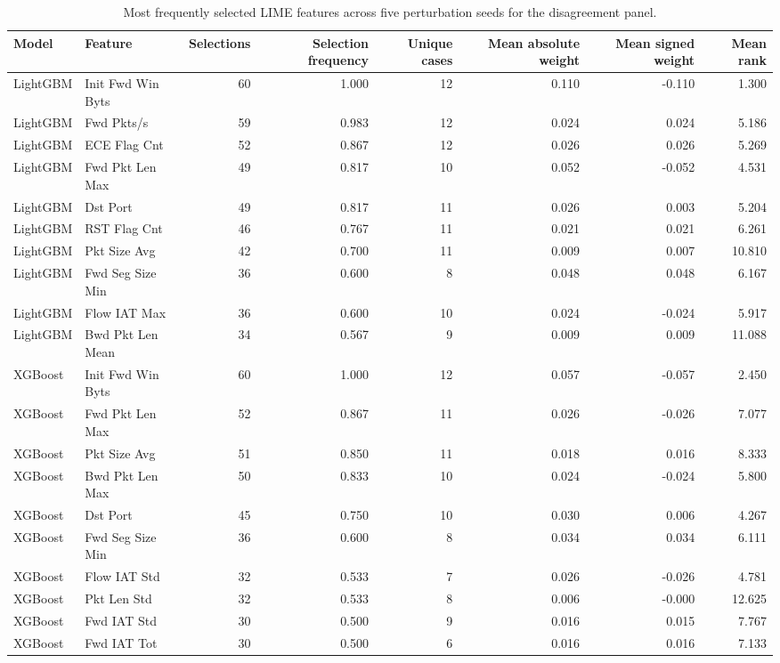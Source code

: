 \begin{table}
\caption{Most frequently selected LIME features across five perturbation seeds for the disagreement panel.}
\label{tab:lime_recurring_features}
\begin{tabular}{llrrrrrr}
\toprule
Model & Feature & Selections & Selection frequency & Unique cases & Mean absolute weight & Mean signed weight & Mean rank \\
\midrule
LightGBM & Init Fwd Win Byts & 60 & 1.000 & 12 & 0.110 & -0.110 & 1.300 \\
LightGBM & Fwd Pkts/s & 59 & 0.983 & 12 & 0.024 & 0.024 & 5.186 \\
LightGBM & ECE Flag Cnt & 52 & 0.867 & 12 & 0.026 & 0.026 & 5.269 \\
LightGBM & Fwd Pkt Len Max & 49 & 0.817 & 10 & 0.052 & -0.052 & 4.531 \\
LightGBM & Dst Port & 49 & 0.817 & 11 & 0.026 & 0.003 & 5.204 \\
LightGBM & RST Flag Cnt & 46 & 0.767 & 11 & 0.021 & 0.021 & 6.261 \\
LightGBM & Pkt Size Avg & 42 & 0.700 & 11 & 0.009 & 0.007 & 10.810 \\
LightGBM & Fwd Seg Size Min & 36 & 0.600 & 8 & 0.048 & 0.048 & 6.167 \\
LightGBM & Flow IAT Max & 36 & 0.600 & 10 & 0.024 & -0.024 & 5.917 \\
LightGBM & Bwd Pkt Len Mean & 34 & 0.567 & 9 & 0.009 & 0.009 & 11.088 \\
XGBoost & Init Fwd Win Byts & 60 & 1.000 & 12 & 0.057 & -0.057 & 2.450 \\
XGBoost & Fwd Pkt Len Max & 52 & 0.867 & 11 & 0.026 & -0.026 & 7.077 \\
XGBoost & Pkt Size Avg & 51 & 0.850 & 11 & 0.018 & 0.016 & 8.333 \\
XGBoost & Bwd Pkt Len Max & 50 & 0.833 & 10 & 0.024 & -0.024 & 5.800 \\
XGBoost & Dst Port & 45 & 0.750 & 10 & 0.030 & 0.006 & 4.267 \\
XGBoost & Fwd Seg Size Min & 36 & 0.600 & 8 & 0.034 & 0.034 & 6.111 \\
XGBoost & Flow IAT Std & 32 & 0.533 & 7 & 0.026 & -0.026 & 4.781 \\
XGBoost & Pkt Len Std & 32 & 0.533 & 8 & 0.006 & -0.000 & 12.625 \\
XGBoost & Fwd IAT Std & 30 & 0.500 & 9 & 0.016 & 0.015 & 7.767 \\
XGBoost & Fwd IAT Tot & 30 & 0.500 & 6 & 0.016 & 0.016 & 7.133 \\
\bottomrule
\end{tabular}
\end{table}
